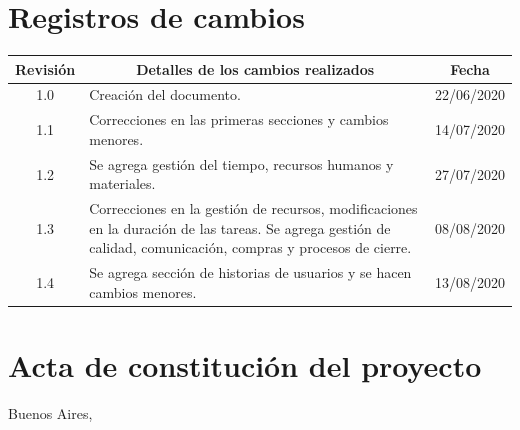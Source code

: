 \documentclass[11pt]{charter}
\begin{document}
\maketitle
\thispagestyle{empty}
\pagebreak

\thispagestyle{empty}
{\setlength{\parskip}{0pt}
\tableofcontents{}
}
\pagebreak

\section{Registros de cambios}
\label{sec:registro}

\begin{table}[ht]
\label{tab:registro}
\centering

\begin{tabularx}{\linewidth}{@{}|c|X|c|@{}}
\hline
\rowcolor[HTML]{C0C0C0} 
Revisión & \multicolumn{1}{c|}{\cellcolor[HTML]{C0C0C0}Detalles de los cambios realizados}     & Fecha      \\ \hline
1.0      & Creación del documento.                                                             & 22/06/2020 \\ \hline
1.1      & Correcciones en las primeras secciones y cambios menores.                           & 14/07/2020 \\ \hline
1.2      & Se agrega gestión del tiempo, recursos humanos y materiales.                        & 27/07/2020 \\ \hline
1.3      & Correcciones en la gestión de recursos, modificaciones en la duración de las tareas.
           Se agrega gestión de calidad, comunicación, compras y procesos de cierre.           & 08/08/2020 \\ \hline
1.4      & Se agrega sección de historias de usuarios y se hacen cambios menores.              & 13/08/2020 \\ \hline
\end{tabularx}
\end{table}

\pagebreak

\section{Acta de constitución del proyecto}
\label{sec:acta}

\begin{flushright}
Buenos Aires, \fechaInicioName
\end{flushright}

\vspace{2cm}
\end{document}
